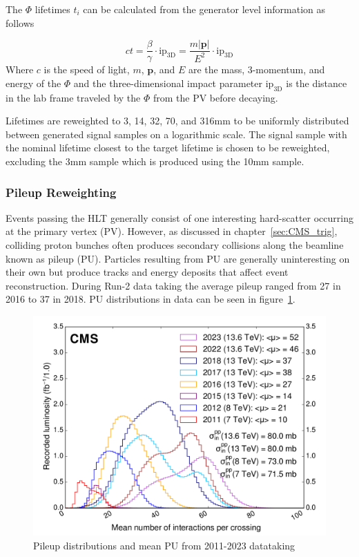 The $\Phi$ lifetimes $t_i$ can be calculated from the generator level information as follows

\begin{equation} \label{eq:lifetime}
	ct=\frac{\beta}{\gamma}\cdot\mathrm{ip}_{\mathrm{3D}}=\frac{m|\mathbf{p}|}{E^2}\cdot\mathrm{ip}_\mathrm{3D}
\end{equation}
Where $c$ is the speed of light, $m$, $\mathbf{p}$, and $E$ are the mass, 3-momentum, and energy of the $\Phi$ and the three-dimensional impact parameter $\mathrm{ip}_\mathrm{3D}$ is the distance in the lab frame traveled by the $\Phi$ from the PV before decaying. 

Lifetimes are reweighted to 3, 14, 32, 70, and 316\unit{mm} to be uniformly distributed between generated signal samples on a logarithmic scale. The signal sample with the nominal lifetime closest to the target lifetime is chosen to be reweighted, excluding the 3\unit{mm} sample which is produced using the 10\unit{mm} sample.

\subsubsection{Pileup Reweighting} \label{sec:ana_pu}
Events passing the HLT generally consist of one interesting hard-scatter occurring at the primary vertex (PV). However, as discussed in chapter~\ref{sec:CMS_trig}, colliding proton bunches often produces secondary collisions along the beamline known as pileup (PU). Particles resulting from PU are generally uninteresting on their own but produce tracks and energy deposits that affect event reconstruction. During Run-2 data taking the average pileup ranged from 27 in 2016 to 37 in 2018. PU distributions in data can be seen in figure~\ref{fig:pileup}.

\begin{figure}[htb!]
	\centering
	\includegraphics[width=0.8\linewidth]{figs/05_analysis/pileup_allYears.pdf}
	\caption[Pileup distributions and mean PU from 2011-2023 datataking~\cite{CMSlumi}]{Pileup distributions and mean PU from 2011-2023 datataking~\cite{CMSlumi}}
	\label{fig:pileup}
\end{figure}

